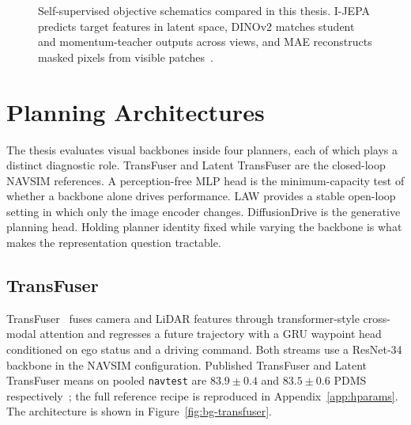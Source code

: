 \begin{figure}[ht]
{}
    \caption[Self-supervised objective schematics.]{Self-supervised objective schematics compared in this thesis. I-JEPA predicts target features in latent space, DINOv2 matches student and momentum-teacher outputs across views, and MAE reconstructs masked pixels from visible patches~\cite{assran-ijepa-2023,oquab-dinov2-2024,caron-dino-2021,he-mae-2022}.}
    \label{fig:bg-ssl-family}
\end{figure}

\section{Planning Architectures}
\label{sec:bg-planning}

The thesis evaluates visual backbones inside four planners, each of which plays a distinct diagnostic role. TransFuser and Latent TransFuser are the closed-loop NAVSIM references. A perception-free MLP head is the minimum-capacity test of whether a backbone alone drives performance. LAW provides a stable open-loop setting in which only the image encoder changes. DiffusionDrive is the generative planning head. Holding planner identity fixed while varying the backbone is what makes the representation question tractable.

\subsection{TransFuser}
\label{sec:bg-transfuser}

TransFuser~\cite{chitta-transfuser-2023,prakash-transfuser-2021} fuses camera and LiDAR features through transformer-style cross-modal attention and regresses a future trajectory with a GRU waypoint head conditioned on ego status and a driving command. Both streams use a ResNet-34 backbone in the NAVSIM configuration. Published TransFuser and Latent TransFuser means on pooled \texttt{navtest} are $83.9 \pm 0.4$ and $83.5 \pm 0.6$ PDMS respectively~\cite{dauner-navsim-2024}; the full reference recipe is reproduced in Appendix~\ref{app:hparams}. The architecture is shown in Figure~\ref{fig:bg-transfuser}.

